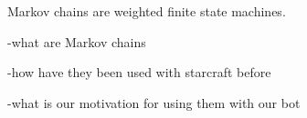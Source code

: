 Markov chains are weighted finite state machines.


-what are Markov chains

-how have they been used with starcraft before

-what is our motivation for using them with our bot